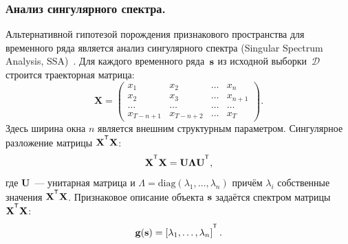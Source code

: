 \subsubsection{Анализ сингулярного спектра.}
Альтернативной гипотезой порождения признакового пространства для временного ряда является анализ сингулярного спектра (Singular Spectrum Analysis, SSA)~\cite{hassani2007singular}. 
Для каждого временного ряда~$\mathbf{s}$ из исходной выборки~$\mathcal{D}$ строится траекторная матрица:
\[
	\mathbf{X} = 
	\begin{pmatrix}
		x_1 & x_2 & \dots & x_n \\
		x_2 & x_3 & \dots & x_{n+1} \\
		\dots & \dots & \dots & \dots \\
		x_{T-n+1} & x_{T-n+2} & \dots & x_T
	\end{pmatrix}.
\]
Здесь ширина окна $n$ является внешним структурным параметром.
Сингулярное разложение матрицы $\mathbf{X}^{\T} \mathbf{X}$:
\[
	\mathbf{X}^{\T} \mathbf{X} = \mathbf{U} \mathbf{\Lambda} \mathbf{U}^{\T},
\]
где $\mathbf{U}$~--- унитарная матрица и $\Lambda = \mathrm{diag}(\lambda_1, \dots, \lambda_n)$ причём $\lambda_i$ собственные значения $\mathbf{X}^{\T} \mathbf{X}$. 
Признаковое описание объекта $\mathbf{s}$ задаётся спектром матрицы $\mathbf{X}^{\T} \mathbf{X}$:
\[
	\mathbf{g}(\bs) = \left[\lambda_1, \dots, \lambda_n\right]^{\T}.
\]
